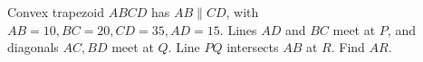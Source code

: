 Convex trapezoid $ABCD$ has $AB\parallel CD$, with $AB=10,BC=20,CD=35,AD=15$. Lines $AD$ and $BC$ meet at $P$, and diagonals $AC,BD$ meet at $Q$. Line $PQ$ intersects $AB$ at $R$. Find $AR$.
